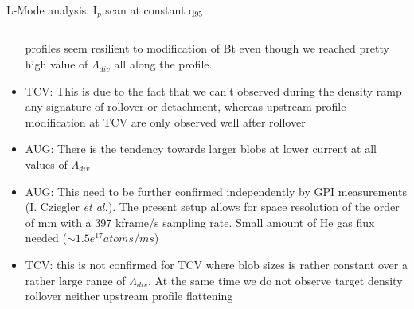 \documentclass[10pt, compress]{beamer}
\begin{document}
\begin{frame}{L-Mode analysis: I$_p$ scan at constant q$_{95}$}
\begin{columns}
\begin{column}{0.35\textwidth}
\begin{itemize}
        profiles seem resilient to modification of Bt even though we
        reached pretty high value of $\Lambda_{div}$ all along the profile.
      \item<9|only@9> TCV: This is due to the fact that we can't
        observed during the density ramp any signature of rollover or detachment,
        \alert{whereas upstream profile modification at TCV are only observed
        well after rollover}
      \item<10|only@10> AUG: There is the tendency towards larger blobs
        at lower current at all values of $\Lambda_{div}$
      \item<11|only@11> AUG: This need to be further confirmed
        independently by GPI measurements (I. Cziegler \textit{et al.}). The present setup allows
        for space resolution of the order of mm with a 397 kframe/s
        sampling rate. Small amount of He gas flux needed ($\sim
        1.5e^{17} atoms/ms$)
      \item<12|only@12> TCV: this is not confirmed for TCV where blob
        sizes is rather constant over a rather large range of
        $\Lambda_{div}$. At the same time we do not observe target
        density rollover neither upstream profile flattening 
      \end{itemize}
    \end{column}
\end{columns}
\end{frame}
\end{document}
